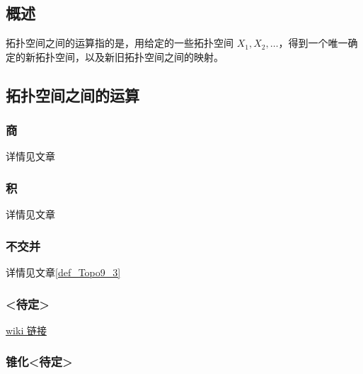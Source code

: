 
\begin{issues}
\issueDraft
\issueTODO
\issueMissDepend
\issueAbstract
\issueNeedCite
\end{issues}

\subsection{概述}

拓扑空间之间的运算指的是，用给定的一些拓扑空间 $X_1, X_2, \dots$，得到一个唯一确定的新拓扑空间，以及新旧拓扑空间之间的映射。


\subsection{拓扑空间之间的运算}

\subsubsection{商}

详情见文章


\subsubsection{积}

详情见文章


\subsubsection{不交并}

详情见文章\autoref{def_Topo9_3} 


\subsubsection{<待定>}

\href{https://en.m.wikipedia.org/wiki/Join_(topology)}{wiki 链接}


\subsubsection{锥化<待定>}

